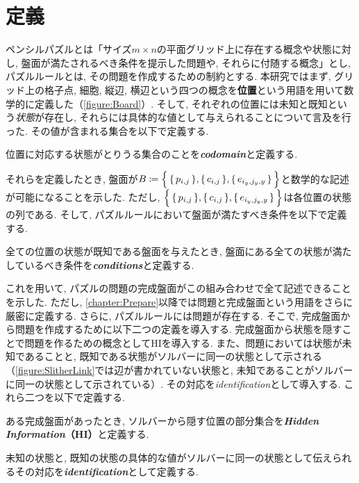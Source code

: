 \section{定義}\label{section:IntroDefinition}
ペンシルパズルとは「サイズ$m\times n$の平面グリッド上に存在する概念や状態に対し, 盤面が満たされるべき条件を提示した問題や, それらに付随する概念」とし, パズルルールとは, その問題を作成するための制約とする. 本研究ではまず, グリッド上の格子点, 細胞, 縦辺, 横辺という四つの概念を\textbf{位置}という用語を用いて数学的に定義した（\cref{figure:Board}）. そして, それぞれの位置には未知と既知という\textit{状態}が存在し, それらには具体的な値として与えられることについて言及を行った. その値が含まれる集合を以下で定義する.
\begin{definition}
	位置に対応する状態がとりうる集合のことを\textbf{\textit{codomain}}と定義する.
\end{definition}
それらを定義したとき, 盤面が$B\coloneqq\Bigl\{\,\{\,p_{i,j}\,\},\{\,c_{i,j}\,\},\{\,e_{i_y,j_y,y}\,\}\,\Bigr\}$と数学的な記述が可能になることを示した. ただし, $\Bigl\{\,\{\,p_{i,j}\,\},\{\,c_{i,j}\,\},\{\,e_{i_y,j_y,y}\,\}\,\Bigr\}$は各位置の状態の列である. そして, パズルルールにおいて盤面が満たすべき条件を以下で定義する.
\begin{definition}
	全ての位置の状態が既知である盤面を与えたとき, 盤面にある全ての状態が満たしているべき条件を\textbf{\textit{conditions}}と定義する.
\end{definition}
これを用いて, パズルの問題の完成盤面がこの組み合わせで全て記述できることを示した. ただし, \cref{chapter:Prepare}以降では問題と完成盤面という用語をさらに厳密に定義する. さらに, パズルルールには問題が存在する. そこで, 完成盤面から問題を作成するために以下二つの定義を導入する. 完成盤面から状態を隠すことで問題を作るための概念としてHIを導入する. また、問題においては状態が未知であることと, 既知である状態がソルバーに同一の状態として示される（\cref{figure:SlitherLink}では辺が書かれていない状態と, 未知であることがソルバーに同一の状態として示されている）. その対応を\textit{identification}として導入する. これら二つを以下で定義する.
\begin{definition}
	ある完成盤面があったとき, ソルバーから隠す位置の部分集合を\textbf{\textit{Hidden Information}（HI）}と定義する.
\end{definition}
\begin{definition}
	未知の状態と, 既知の状態の具体的な値がソルバーに同一の状態として伝えられるその対応を\textbf{\textit{identification}}として定義する.
\end{definition}

